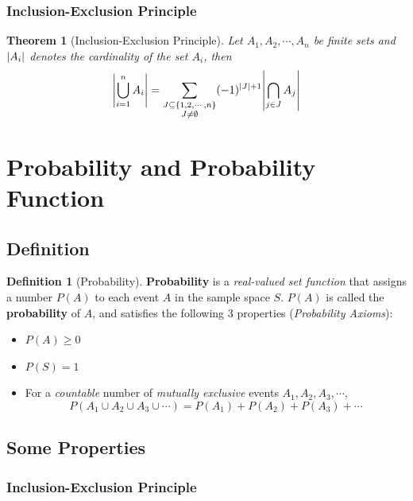 \documentclass[10pt,UTF8]{article}
\newenvironment{definition box}
{\begin{tcolorbox}[colback=blue!5!white,colframe=blue!75!black,parbox=false,before upper=\par,before lower=\par]}
{\end{tcolorbox}}
\newenvironment{theorem box}
{\begin{tcolorbox}[colback=yellow!5!white,colframe=yellow!75!black,parbox=false,before upper=\par,before lower=\par]}
{\end{tcolorbox}}
\theoremstyle{definition}
\newtheorem{definition inner}{Definition}[section]
\newenvironment{definition}[1][]
{\begin{definition box}\begin{definition inner}[#1]\hfill\par}
{\end{definition inner}\end{definition box}}
\theoremstyle{plain}
\newtheorem{theorem inner}{Theorem}[section]
\newenvironment{theorem}[1][]
{\begin{theorem box}\begin{theorem inner}[#1]\hfill\par}
{\end{theorem inner}\end{theorem box}}
\theoremstyle{definition}
\newtheorem*{proof inner}{\textit{Proof}}
\theoremstyle{remark}
\begin{document}
\subsubsection{Inclusion-Exclusion Principle}
\begin{theorem}[Inclusion-Exclusion Principle]
    Let $A_1, A_2, \cdots, A_n$ be finite sets and
    $\abs{A_i}$ denotes the cardinality of the set $A_i$, then
    \begin{gather*}
        \abs{\bigcup_{i=1}^n A_i} = 
        \sum_{\substack{J \subseteq \{1,2,\cdots,n\}\\J\neq\emptyset}}(-1)^{\abs{J}+1}
        \abs{\bigcap_{j\in J} A_j}
    \end{gather*}
\end{theorem}

\section{Probability and Probability Function}

\subsection{Definition}

\begin{definition}[Probability]
    \textbf{Probability} is a \emph{real-valued set function} that assigns
    a number $P(A)$ to each event $A$ in the sample space $S$.
    $P(A)$ is called the \textbf{probability} of $A$,
    and satisfies the following 3 properties (\emph{Probability Axioms}):
    
    \begin{itemize}
        \item $P(A) \geqslant 0$
        \item $P(S) = 1$
        \item For a \emph{countable} number of \emph{mutually exclusive} events
        $A_1, A_2, A_3, \cdots$,
        \[P(A_1\cup A_2\cup A_3\cup \cdots)=P(A_1)+P(A_2)+P(A_3)+\cdots\]
    \end{itemize}
\end{definition}
    
\subsection{Some Properties}

\subsubsection{Inclusion-Exclusion Principle}
\end{document}
